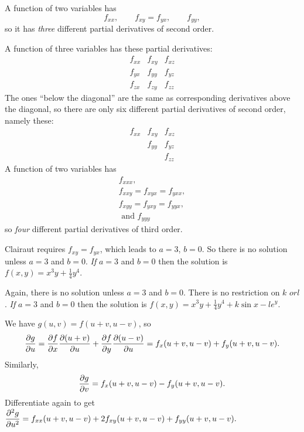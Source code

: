 A function of two variables has
\[
  f_{xx},\qquad f_{xy}=f_{yx},\qquad f_{yy},
\]
so it has \emph{three} different partial derivatives of second order.

A function of three variables has these partial derivatives:
\[
  \begin{matrix}
    f_{xx} & f_{xy} & f_{xz} \\
    f_{yx} & f_{yy} & f_{yz} \\
    f_{zx} & f_{zy} & f_{zz}
  \end{matrix}
\]
The ones ``below the diagonal'' are the same as corresponding derivatives
above the diagonal, so there are only six different partial derivatives
of second order, namely these:
\[
  \begin{matrix}
    f_{xx} & f_{xy} & f_{xz} \\
    & f_{yy} & f_{yz} \\
    & & f_{zz}
  \end{matrix}
\]
A function of two variables has
\begin{gather*}
  f_{xxx}, \\
  f_{xxy}=f_{xyx}=f_{yxx}, \\
  f_{xyy}=f_{yxy}=f_{yyx},\\
  \text{ and } f_{yyy}
\end{gather*}
so \emph{four} different partial derivatives of third order.
\bigskip

\item[{\bfseries(IV15.14a)}]

Clairaut requires $f_{xy} = f_{yx}$, which leads to $a=3$, $b=0$.  So there is no solution unless $a=3$ and $b=0$.  \emph{If} $a=3$ and $b=0$ then the solution is $f(x,y) = x^3y + \frac14 y^4 $.
\bigskip

\item[{\bfseries(IV15.14b)}]

Again, there is no solution unless $a=3$ and $b=0$.  There is no restriction on $k$ $or l$.  \emph{If} $a=3$ and $b=0$ then the solution is $f(x,y) = x^3y + \frac14 y^4 + k\sin x - le^y$.
\bigskip

\item[{\bfseries(IV15.15a)}]

We have $g(u,v) = f(u+v, u-v)$, so
\[
  \frac{\partial g}{\partial u} = \frac{\partial f}{\partial x} \frac{\partial (u+v)}{\partial u} + \frac{\partial f}{\partial y} \frac{\partial (u-v)}{\partial u}
  = f_x(u+v, u-v)+f_y(u+v, u-v).
\]
Similarly,
\[
  \frac{\partial g}{\partial v} = f_x(u+v, u-v) - f_y(u+v, u-v).
\]
Differentiate again to get
\(\displaystyle
  \frac{\partial^2 g}{\partial u^2}
  = f_{xx}(u+v, u-v)+2f_{xy}(u+v, u-v)+f_{yy}(u+v, u-v).
\)
\bigskip

